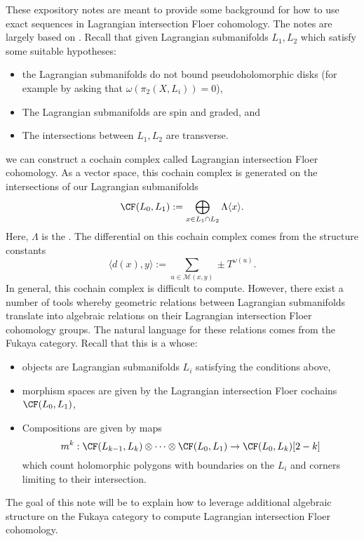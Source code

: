 
\begin{exposition}
These expository notes are meant to provide some background for how to use exact sequences in Lagrangian intersection Floer cohomology. The notes are largely based on \cite{auroux2014beginner}.
Recall that given Lagrangian submanifolds $L_1, L_2$ which satisfy some suitable hypotheses:
\begin{itemize}
    \item the Lagrangian submanifolds do not bound pseudoholomorphic disks (for example by asking that $\omega(\pi_2(X, L_i))=0$), \label{cond:unobstructed} 
    \item The Lagrangian submanifolds are spin and graded, and\label{cond:orientationgrading}
    \item The intersections between $L_1, L_2$ are transverse. \label{cond:transverseintersection}
\end{itemize}
we can construct a cochain complex called Lagrangian intersection Floer cohomology. As a vector space, this cochain complex is generated on the intersections of our Lagrangian submanifolds
\[\CF(L_0, L_1):= \bigoplus_{x\in L_1\cap L_2} \Lambda\langle x\rangle.\]
Here, $\Lambda$ is the .
The differential on this cochain complex comes from the structure constants 
\[\langle d(x), y\rangle:=\sum_{u\in \mathcal M(x, y)}\pm T^{\omega (u)}.\]
In general, this cochain complex is difficult to compute. However, there exist a number of tools whereby geometric relations between Lagrangian submanifolds translate into algebraic relations on their Lagrangian intersection Floer cohomology groups. The natural language for these relations comes from the Fukaya category. Recall that this is a  whose: 
\begin{itemize}
    \item objects are Lagrangian submanifolds $L_i$ satisfying the conditions above,
    \item morphism spaces are given by the Lagrangian intersection Floer cochains $\CF(L_0, L_1)$,
    \item Compositions are given by maps 
    \[m^k: \CF(L_{k-1}, L_k)\otimes\cdots \otimes \CF(L_0, L_1)\to \CF(L_0, L_k)[2-k]\]
    which count holomorphic polygons with boundaries on the $L_i$ and corners limiting to their intersection. 
\end{itemize}

The goal of this note will be to explain how to leverage additional algebraic structure on the Fukaya category to compute Lagrangian intersection Floer cohomology.


\end{exposition}
